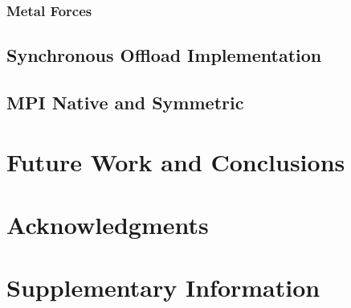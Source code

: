 \documentclass[fleqn,12pt,onecolumn]{ipcc} %
\begin{document}
\subsubsection{Metal Forces}

\subsection{Synchronous Offload Implementation}
\label{sec:offload}

\subsection{MPI Native and Symmetric}
\label{sec:mpis}


\section{Future Work and Conclusions}

\section*{Acknowledgments} %





\section*{Supplementary Information} %

\end{document}
